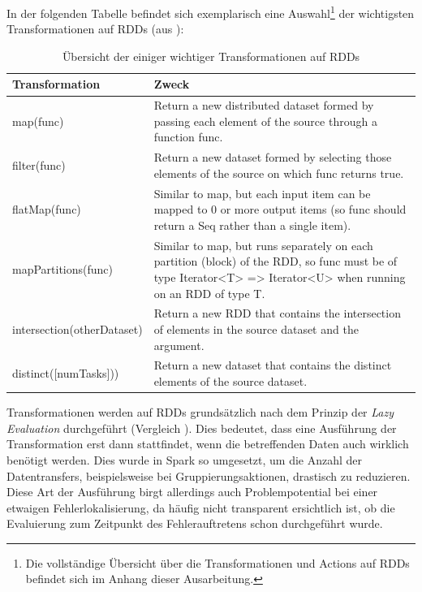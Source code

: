  \newpage
In der folgenden Tabelle befindet sich exemplarisch eine Auswahl\footnote{Die vollständige Übersicht über die Transformationen und Actions auf RDDs befindet sich im Anhang dieser Ausarbeitung.} der wichtigsten Transformationen auf RDDs (aus ): 


\begin{table}[!ht]
\centering
\begin{tabular}{| p{5cm} | p{8cm} | }
\hline
Transformation & Zweck \\ \hline \hline
map(func) & Return a new distributed dataset formed by passing each element of the source through a function func.  \\ \hline 
filter(func) & Return a new dataset formed by selecting those elements of the source on which func returns true. \\ \hline 
flatMap(func) & Similar to map, but each input item can be mapped to 0 or more output items (so func should return a Seq rather than a single item).\\ \hline 
mapPartitions(func) & Similar to map, but runs separately on each partition (block) of the RDD, so func must be of type Iterator<T> => Iterator<U> when running on an RDD of type T. \\ \hline 
intersection(otherDataset) & Return a new RDD that contains the intersection of elements in the source dataset and the argument. \\ \hline 
distinct([numTasks])) & Return a new dataset that contains the distinct elements of the source dataset. \\ \hline 

\end{tabular}
\caption{Übersicht der einiger wichtiger Transformationen auf RDDs}
	\label{tab:transformations}
\end{table}

Transformationen werden auf RDDs grundsätzlich nach dem Prinzip der \textit{Lazy Evaluation} durchgeführt  (Vergleich ). Dies bedeutet, dass eine Ausführung der Transformation erst dann stattfindet, wenn die betreffenden Daten auch wirklich benötigt werden. Dies wurde in Spark so umgesetzt, um die Anzahl der Datentransfers, beispielsweise bei Gruppierungsaktionen, drastisch zu reduzieren. Diese Art der Ausführung birgt allerdings auch Problempotential bei einer etwaigen Fehlerlokalisierung, da häufig nicht transparent ersichtlich ist, ob die Evaluierung zum Zeitpunkt des Fehlerauftretens schon durchgeführt wurde. 



